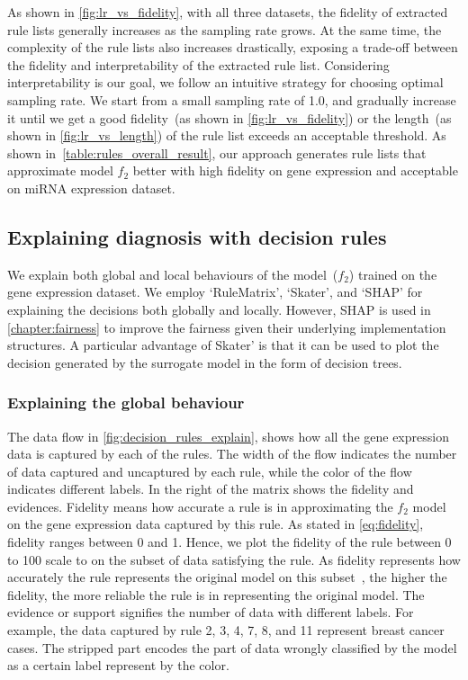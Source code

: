 \hspace*{3.5mm} As shown in \cref{fig:lr_vs_fidelity}, with all three datasets, the fidelity of extracted rule lists generally increases as the sampling rate grows. At the same time, the complexity of the rule lists also increases drastically, exposing a trade-off between the fidelity and interpretability of the extracted rule list. Considering interpretability is our goal, we follow an intuitive strategy for choosing optimal sampling rate. We  start from a small sampling rate of 1.0, and gradually increase it until we get a good fidelity~(as shown in \cref{fig:lr_vs_fidelity}) or the length~(as shown in \cref{fig:lr_vs_length}) of the rule list exceeds an acceptable threshold. As shown in~\cref{table:rules_overall_result}, our approach generates rule lists that approximate model $f_2$ better with high fidelity on gene expression and acceptable on miRNA expression dataset. 

\subsection{Explaining diagnosis with decision rules}
We explain both global and local behaviours of the model~($f_2$) trained on the gene expression dataset. We employ `RuleMatrix', `Skater', and `SHAP' for explaining the decisions both globally and locally. However, SHAP is used in \cref{chapter:fairness} to improve the fairness given their underlying implementation structures. A particular advantage of Skater' is that it can be used to plot the decision generated by the surrogate model in the form of decision trees. 

\subsubsection{Explaining the global behaviour}
The data flow in \cref{fig:decision_rules_explain}, shows how all the gene expression data is captured by each of the rules. The width of the flow indicates the number of data captured and uncaptured by each rule, while the color of the flow indicates different labels. In the right of the matrix shows the fidelity and evidences. Fidelity means how accurate a rule is in approximating the $f_2$ model on the gene expression data captured by this rule. 
As stated in \cref{eq:fidelity}, fidelity ranges between 0 and 1. Hence, we plot the fidelity of the rule between 0 to 100 scale to on the subset of data satisfying the rule. As fidelity represents how accurately the rule represents the original model on this subset~\cite{ming2018rulematrix}, the higher the fidelity, the more reliable the rule is in representing the original model. The evidence or support signifies the number of data with different labels. For example, the data captured by rule 2, 3, 4, 7, 8, and 11 represent breast cancer cases. The stripped part encodes the part of data wrongly classified by the model as a certain label represent by the color.

